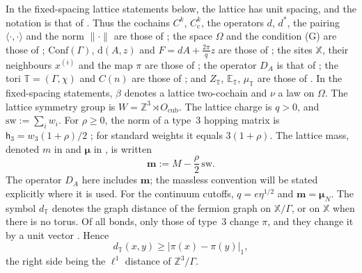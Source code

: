 \documentclass[11pt]{amsart}
\theoremstyle{definition}
\begin{document}
In the fixed-spacing lattice statements below, the lattice has unit spacing, and the notation is that of \cite[Section~2]{QEDII}.
Thus the cochains $C^k$, $C^k_{\mathrm c}$, the operators $d$, $d^{*}$, the pairing $\langle\cdot,\cdot\rangle$ and the norm $\|\cdot\|$ are those of \cite[Definition~2.1]{QEDII};
the space $\Omega$ and the condition (G) are those of \cite[Definition~2.5]{QEDII};
$\mathrm{Conf}(\Gamma)$, $\mathrm d(A,z)$ and $F=dA+\frac{2\pi}{q}z$ are those of \cite[Definition~2.6]{QEDII};
the sites $\mathbb X$, their neighbours $x^{(i)}$ and the map $\pi$ are those of \cite[Definition~2.4]{QEDII};
the operator $D_A$ is that of \cite[Definition~2.10]{QEDII};
the tori $\mathbb T=(\Gamma,\chi)$ and $C(n)$ are those of \cite[Definition~2.11]{QEDII};
and $Z_{\mathbb T}$, $\mathbb E_{\mathbb T}$, $\mu_{\mathbb T}$ are those of \cite[Definition~2.13]{QEDII}.
In the fixed-spacing statements, $\beta$ denotes a lattice two-cochain and $\nu$ a law on $\Omega$.
The lattice symmetry group is $W=\mathbb Z^3\rtimes O_{\mathrm{cub}}$.
The lattice charge is $q>0$, and $\mathrm{sw}:=\sum_iw_i$.
For $\rho\ge0$, the norm of a type~3 hopping matrix is
$\mathsf h_3=w_3(1+\rho)/2$ \cite[Lemma~3.8(a)]{QEDII};
for standard weights it equals $3(1+\rho)$.
The lattice mass, denoted $m$ in \cite[Definition~2.10]{QEDII} and $\boldsymbol\mu$ in \cite[(I.2.5)]{QEDIII}, is written
\begin{equation*}
\mathbf m:=M-\frac{\rho}{2}\,\mathrm{sw}.
\end{equation*}
The operator $D_A$ here includes $\mathbf m$; the massless convention
will be stated explicitly where it is used. For the continuum cutoffs,
$q=e\eta^{1/2}$ and $\mathbf m=\boldsymbol\mu_N$.
The symbol $d_{\mathbb T}$ denotes the graph distance of the fermion graph on $\mathbb X/\Gamma$, or on $\mathbb X$ when there is no torus.
Of all bonds, only those of type~$3$ change $\pi$, and they change it by a unit vector \cite[Proposition~3.6\,(c)]{QEDII}.
Hence
\begin{equation*}
d_{\mathbb T}(x,y)\ge|\pi(x)-\pi(y)|_1,
\end{equation*}
the right side being the $\ell^1$ distance of $\mathbb Z^3/\Gamma$.
\end{document}
